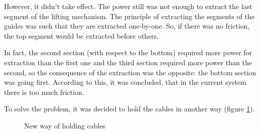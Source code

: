 \begin{enumerate*}
  However, it didn't take effect. The power still was not enough to extract the last segment of the lifting mechanism. The principle of extracting the segments of the guides was such that they are extracted one-by-one. So, if there was no friction, the top segment would be extracted before others.

  In fact, the second section (with respect to the bottom) required more power for extraction than the first one and the third section required more power than the second, so the consequence of the extraction was the opposite: the bottom section was going first. According to this, it was concluded, that in the current system there is too much friction.

  To solve the problem, it was decided to hold the cables in another way (figure \ref{Elevator500}).

  \begin{figure}[H]
  	\begin{minipage}[h]{1\linewidth}
  		\caption{New way of holding cables}
  		\label{Elevator500}
  	\end{minipage}
  \end{figure}



\end{enumerate*}

